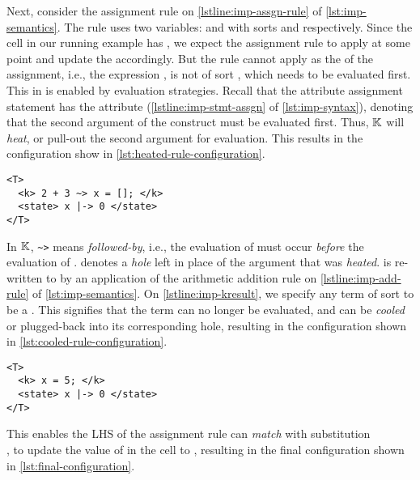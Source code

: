 Next, consider the assignment rule on \autoref{lstline:imp-assgn-rule} of
\autoref{lst:imp-semantics}. The rule uses two variables:  and 
with sorts  and  respectively. Since the 
cell in our running example has , we expect the assignment
rule to apply at some point and update the  accordingly.
But the rule cannot apply as the \RHS{} of the assignment, i.e., the expression
, is not of sort , which needs to be evaluated
first. This in \K{} is enabled by evaluation strategies.
Recall that the attribute assignment statement has the attribute
 (\autoref{lstline:imp-stmt-assgn} of
\autoref{lst:imp-syntax}), denoting that the second argument of the
construct must be evaluated first. Thus,
$\mathbb{K}$ will \emph{heat}, or pull-out the second
argument for evaluation. This results in the configuration show in
\autoref{lst:heated-rule-configuration}.

\begin{lstlisting}[float=h!,language=k,style=ksty,frame=single,label=lst:heated-rule-configuration,caption={Post
Heating Configuration}]
<T>
  <k> 2 + 3 ~> x = []; </k>
  <state> x |-> 0 </state>
</T>
\end{lstlisting}

In $\mathbb{K}{}$, \lstinline[style=inlineksty]{~>} means \emph{followed-by}, i.e.,
the evaluation of  must occur \emph{before} the evaluation
of . \inlinek{[]} denotes a \emph{hole} left in place of
the argument that was \emph{heated}.
is re-written to 
by an application of the arithmetic addition rule on
\autoref{lstline:imp-add-rule} of \autoref{lst:imp-semantics}. On
\autoref{lstline:imp-kresult},
we specify any term of sort  to be a .
This signifies that the term can no longer be evaluated, and can be \emph{cooled}
or plugged-back into its corresponding hole, resulting in the configuration
shown in \autoref{lst:cooled-rule-configuration}.

\begin{lstlisting}[float=h!,language=k,style=ksty,frame=single,label=lst:cooled-rule-configuration,caption={Post
Cooling Configuration}]
<T>
  <k> x = 5; </k>
  <state> x |-> 0 </state>
</T>

\end{lstlisting}

This enables the LHS of the assignment rule can \emph{match} with substitution
\\ , to
update the value of  in the  cell
to , resulting in the final configuration shown in
\autoref{lst:final-configuration}.

